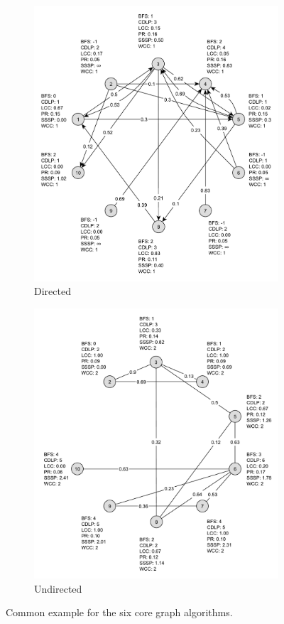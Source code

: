 \begin{figure}[h]
	\centering
	\begin{subfigure}{0.496\textwidth}
		\centering
		\includegraphics[scale=\examplescale]{figures/examples/common-dir.pdf}
		\caption{Directed}
	\end{subfigure}
	\begin{subfigure}{0.496\textwidth}
		\centering
		\includegraphics[scale=\examplescale]{figures/examples/common-undir.pdf}
		\caption{Undirected}
	\end{subfigure}
	\caption{Common example for the six core graph algorithms.}
	\label{fig:common_example}
\end{figure}
